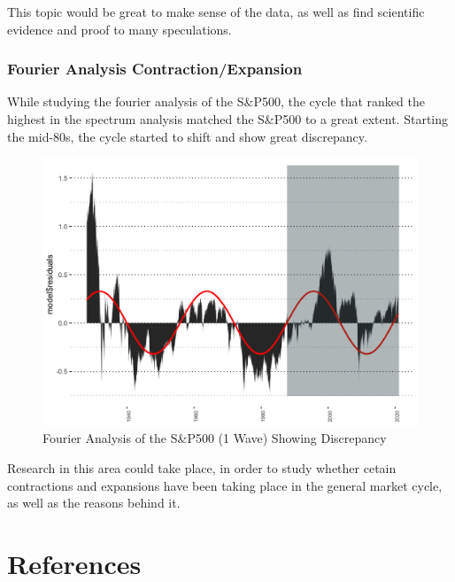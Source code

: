 \documentclass[]{book}
\begin{document}
This topic would be great to make sense of the data, as well as find scientific evidence and proof to many speculations.

\hypertarget{fourier-analysis-contractionexpansion}{%
\subsection{Fourier Analysis Contraction/Expansion}\label{fourier-analysis-contractionexpansion}}

While studying the fourier analysis of the S\&P500, the cycle that ranked the highest in the spectrum analysis matched the S\&P500 to a great extent. Starting the mid-80s, the cycle started to shift and show great discrepancy.

\begin{figure}
\centering
\includegraphics{data/fourier.png}
\caption{\label{fig:unnamed-chunk-114}Fourier Analysis of the S\&P500 (1 Wave) Showing Discrepancy}
\end{figure}

Research in this area could take place, in order to study whether cetain contractions and expansions have been taking place in the general market cycle, as well as the reasons behind it.

\hypertarget{ref}{%
\chapter{References}\label{ref}}


\end{document}
